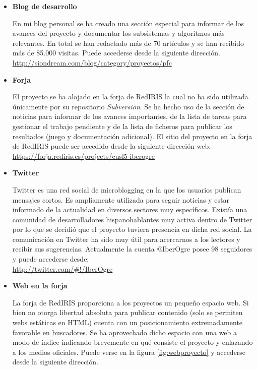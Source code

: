 \begin{itemize}
    \item \textbf{Blog de desarrollo}
    
    En mi blog personal se ha creado
    una sección especial para informar de los avances del proyecto y documentar
    los subsistemas y algoritmos más relevantes. En total se han redactado
    más de 70 artículos y se han recibido más de 85.000 visitas. Puede accederse
    desde la siguiente dirección.\\
    
    \url{http://siondream.com/blog/category/proyectos/pfc}\\
    
    \item \textbf{Forja}
    
    El proyecto se ha alojado en la forja de RedIRIS la cual no ha sido utilizada
    únicamente por su repositorio \textit{Subversion}. Se ha hecho uso
    de la sección de noticias para informar de los avances importantes,
    de la lista de tareas para gestionar el trabajo pendiente y de la lista
    de ficheros para publicar los resultados (juego y documentación adicional).
    El sitio del proyecto en la forja de RedIRIS puede ser accedido desde
    la siguiente dirección web.\\
    
    \url{https://forja.rediris.es/projects/cusl5-iberogre}\\
    
    \item \textbf{Twitter}
    
    Twitter es una red social de microblogging en la que los usuarios publican
    mensajes cortos. Es ampliamente utilizada para seguir noticias y estar
    informado de la actualidad en diversos sectores muy específicos. Existía
    una comunidad de desarrolladores hispanohablantes muy activa dentro de Twitter
    por lo que se decidió que el proyecto tuviera presencia en dicha red social.
    La comunicación en Twitter ha sido muy útil para acercarnos a los lectores
    y recibir sus sugerencias. Actualmente la cuenta $@$IberOgre posee 98
    seguidores y puede accederse desde:\\
    
    \url{http://twitter.com/#!/IberOgre}\\
    
    \item \textbf{Web en la forja}
    
    La forja de RedIRIS proporciona a los proyectos un pequeño espacio web.
    Si bien no otorga libertad absoluta para publicar contenido (solo
    se permiten webs estáticas en HTML) cuenta con un posicionamiento
    extremadamente favorable en buscadores. Se ha aprovechado dicho espacio
    con una web a modo de índice indicando brevemente en qué consiste el
    proyecto y enlazando a los medios oficiales. Puede verse en la figura
    \ref{fig:webproyecto} y accederse desde la siguiente dirección.\\
    

\end{itemize}
